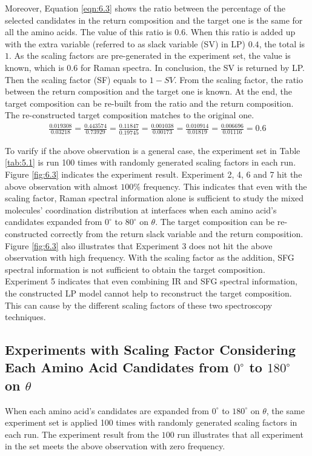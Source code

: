 Moreover, Equation \ref{eqn:6.3} shows the ratio between the percentage of the selected candidates in the return composition and the target one is the same for all the amino acids. The value of this ratio is $0.6$. When this ratio is added up with the extra variable (referred to as slack variable (SV) in LP) $0.4$, the total is $1$. As the scaling factors are pre-generated in the experiment set, the value is known, which is $0.6$ for Raman spectra. In conclusion, the SV is returned by LP. Then the scaling factor (SF) equals to $1 - SV$. From the scaling factor, the ratio between the return composition and the target one is known. At the end, the target composition can be re-built from the ratio and the return composition. The re-constructed target composition matches to the original one. \\

\begin{eqnarray} \label{eqn:6.3}
\frac{0.019308}{0.03218} = \frac{0.443574}{0.73929} = \frac{0.11847}{0.19745} =\frac{0.001038}{0.00173}  = \frac{0.010914}{0.01819} = \frac{0.006696}{0.01116} = 0.6
\end{eqnarray}

To varify if the above observation is a general case, the experiment set in Table \ref{tab:5.1} is run 100 times with randomly generated scaling factors in each run. Figure \ref{fig:6.3} indicates the experiment result. Experiment 2, 4, 6 and 7 hit the above observation with almost $100\%$ frequency. This indicates that even with the scaling factor, Raman spectral information alone is sufficient to study the mixed molecules' coordination distribution at interfaces when each amino acid's candidates expanded from $0^{\circ}$ to $80^{\circ}$ on $\theta$. The target composition can be re-constructed correctly from the return slack variable and the return composition. Figure \ref{fig:6.3} also illustrates that Experiment 3 does not hit the above observation with high frequency. With the scaling factor as the addition, SFG spectral information is not sufficient to obtain the target composition. Experiment 5 indicates that even combining IR and SFG spectral information, the constructed LP model cannot help to reconstruct the target composition. This can cause by the different scaling factors of these two spectroscopy techniques. \\

\subsection{Experiments with Scaling Factor Considering Each Amino Acid Candidates from $0^{\circ}$ to $180^{\circ}$ on $\theta$}
When each amino acid's candidates are expanded from $0^{\circ}$ to $180^{\circ}$ on $\theta$, the same experiment set is applied 100 times with randomly generated scaling factors in each run. The experiment result from the $100$ run illustrates that all experiment in the set meets the above observation with zero frequency. \\

